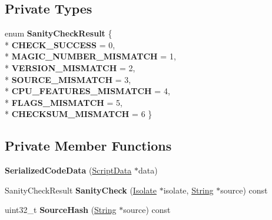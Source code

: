 \subsection*{Private Types}
\begin{DoxyCompactItemize}
\item 
enum {\bfseries Sanity\+Check\+Result} \{ \\*
{\bfseries C\+H\+E\+C\+K\+\_\+\+S\+U\+C\+C\+E\+SS} = 0, 
\\*
{\bfseries M\+A\+G\+I\+C\+\_\+\+N\+U\+M\+B\+E\+R\+\_\+\+M\+I\+S\+M\+A\+T\+CH} = 1, 
\\*
{\bfseries V\+E\+R\+S\+I\+O\+N\+\_\+\+M\+I\+S\+M\+A\+T\+CH} = 2, 
\\*
{\bfseries S\+O\+U\+R\+C\+E\+\_\+\+M\+I\+S\+M\+A\+T\+CH} = 3, 
\\*
{\bfseries C\+P\+U\+\_\+\+F\+E\+A\+T\+U\+R\+E\+S\+\_\+\+M\+I\+S\+M\+A\+T\+CH} = 4, 
\\*
{\bfseries F\+L\+A\+G\+S\+\_\+\+M\+I\+S\+M\+A\+T\+CH} = 5, 
\\*
{\bfseries C\+H\+E\+C\+K\+S\+U\+M\+\_\+\+M\+I\+S\+M\+A\+T\+CH} = 6
 \}\hypertarget{classv8_1_1internal_1_1_serialized_code_data_a5f99aa9dffa478e9ae70db3ce97bf214}{}\label{classv8_1_1internal_1_1_serialized_code_data_a5f99aa9dffa478e9ae70db3ce97bf214}

\end{DoxyCompactItemize}
\subsection*{Private Member Functions}
\begin{DoxyCompactItemize}
\item 
{\bfseries Serialized\+Code\+Data} (\hyperlink{classv8_1_1internal_1_1_script_data}{Script\+Data} $\ast$data)\hypertarget{classv8_1_1internal_1_1_serialized_code_data_ada831fb6150e04b819c59f13a17ab3ae}{}\label{classv8_1_1internal_1_1_serialized_code_data_ada831fb6150e04b819c59f13a17ab3ae}

\item 
Sanity\+Check\+Result {\bfseries Sanity\+Check} (\hyperlink{classv8_1_1internal_1_1_isolate}{Isolate} $\ast$isolate, \hyperlink{classv8_1_1internal_1_1_string}{String} $\ast$source) const \hypertarget{classv8_1_1internal_1_1_serialized_code_data_acb6b489b93a62e0f34237d29faaedc5f}{}\label{classv8_1_1internal_1_1_serialized_code_data_acb6b489b93a62e0f34237d29faaedc5f}

\item 
uint32\+\_\+t {\bfseries Source\+Hash} (\hyperlink{classv8_1_1internal_1_1_string}{String} $\ast$source) const \hypertarget{classv8_1_1internal_1_1_serialized_code_data_a657dc4765d169b7f0beab1e652ae0d79}{}\label{classv8_1_1internal_1_1_serialized_code_data_a657dc4765d169b7f0beab1e652ae0d79}

\end{DoxyCompactItemize}
